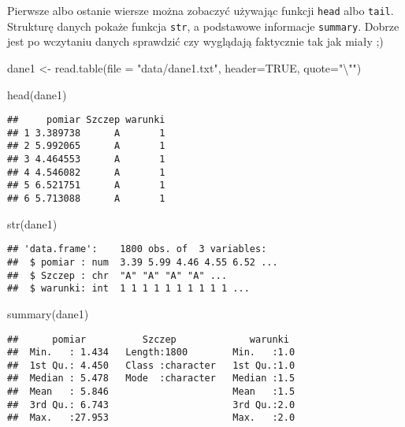 \documentclass[
]{book}
\newenvironment{Shaded}{\begin{snugshade}}{\end{snugshade}}
\newcommand{\AttributeTok}[1]{\textcolor[rgb]{0.77,0.63,0.00}{#1}}
\newcommand{\ConstantTok}[1]{\textcolor[rgb]{0.00,0.00,0.00}{#1}}
\newcommand{\FunctionTok}[1]{\textcolor[rgb]{0.00,0.00,0.00}{#1}}
\newcommand{\NormalTok}[1]{#1}
\newcommand{\OtherTok}[1]{\textcolor[rgb]{0.56,0.35,0.01}{#1}}
\newcommand{\SpecialCharTok}[1]{\textcolor[rgb]{0.00,0.00,0.00}{#1}}
\newcommand{\StringTok}[1]{\textcolor[rgb]{0.31,0.60,0.02}{#1}}
\begin{document}
Pierwsze albo ostanie wiersze można zobaczyć używając funkcji \texttt{head} albo \texttt{tail}. Strukturę danych pokaże funkcja \texttt{str}, a podstawowe informacje \texttt{summary}. Dobrze jest po wczytaniu danych sprawdzić czy wyglądają faktycznie tak jak miały ;)

\begin{Shaded}
\begin{Highlighting}[]
\NormalTok{dane1 }\OtherTok{\textless{}{-}} \FunctionTok{read.table}\NormalTok{(}\AttributeTok{file =} \StringTok{"data/dane1.txt"}\NormalTok{, }\AttributeTok{header=}\ConstantTok{TRUE}\NormalTok{, }\AttributeTok{quote=}\StringTok{"}\SpecialCharTok{\textbackslash{}"}\StringTok{"}\NormalTok{)}

\FunctionTok{head}\NormalTok{(dane1)}
\end{Highlighting}
\end{Shaded}

\begin{verbatim}
##     pomiar Szczep warunki
## 1 3.389738      A       1
## 2 5.992065      A       1
## 3 4.464553      A       1
## 4 4.546082      A       1
## 5 6.521751      A       1
## 6 5.713088      A       1
\end{verbatim}

\begin{Shaded}
\begin{Highlighting}[]
\FunctionTok{str}\NormalTok{(dane1)}
\end{Highlighting}
\end{Shaded}

\begin{verbatim}
## 'data.frame':    1800 obs. of  3 variables:
##  $ pomiar : num  3.39 5.99 4.46 4.55 6.52 ...
##  $ Szczep : chr  "A" "A" "A" "A" ...
##  $ warunki: int  1 1 1 1 1 1 1 1 1 1 ...
\end{verbatim}

\begin{Shaded}
\begin{Highlighting}[]
\FunctionTok{summary}\NormalTok{(dane1)}
\end{Highlighting}
\end{Shaded}

\begin{verbatim}
##      pomiar          Szczep             warunki   
##  Min.   : 1.434   Length:1800        Min.   :1.0  
##  1st Qu.: 4.450   Class :character   1st Qu.:1.0  
##  Median : 5.478   Mode  :character   Median :1.5  
##  Mean   : 5.846                      Mean   :1.5  
##  3rd Qu.: 6.743                      3rd Qu.:2.0  
##  Max.   :27.953                      Max.   :2.0
\end{verbatim}
\end{document}
